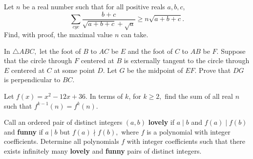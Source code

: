 \documentclass{lucky}
\begin{document}
\begin{prob}{4}
    Let $n$ be a real number such that for all positive reals $a,b,c$, \[\sum_{cyc}\frac{b+c}{\sqrt{a+b+c}+\sqrt{a}}\ge n\sqrt{a+b+c}.\] Find, with proof, the maximal value $n$ can take.
\end{prob}

\begin{req}{6}
    In $\triangle ABC,$ let the foot of $B$ to $AC$ be $E$ and the foot of $C$ to $AB$ be $F.$ Suppose that the circle through $F$ centered at $B$ is externally tangent to the circle through $E$ centered at $C$ at some point $D.$ Let $G$ be the midpoint of $EF.$ Prove that $DG$ is perpendicular to $BC.$
\end{req}

\begin{prob}{6}
    Let $f(x)=x^2-12x+36.$ In terms of $k$, for $k\geq 2,$ find the sum of all real $n$ such that $f^{k-1}(n)=f^k(n).$
\end{prob}

\begin{prob}{9}
    Call an ordered pair of distinct integers $(a,b)$ \textbf{lovely} if $a\mid b$ and $f(a)\mid f(b)$ and \textbf{funny} if $a\mid b$ but $f(a)\nmid f(b),$ where $f$ is a polynomial with integer coefficients. Determine all polynomials $f$ with integer coefficients such that there exists infinitely many \textbf{lovely} and \textbf{funny} pairs of distinct integers.
\end{prob}
\end{document}
